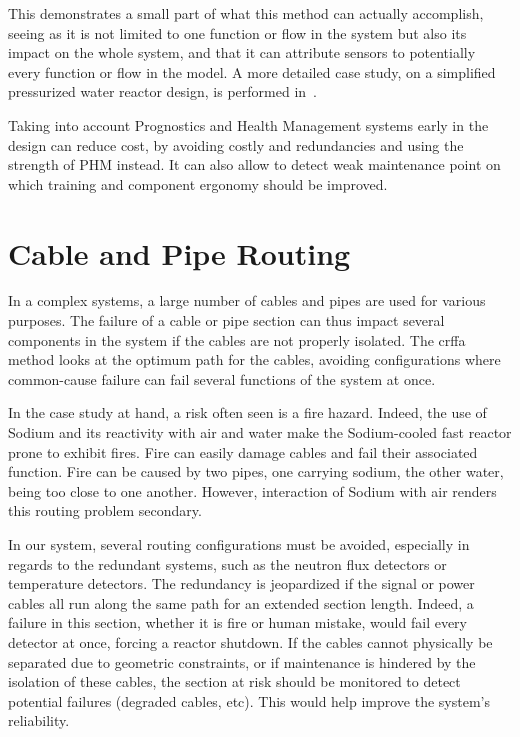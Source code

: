This demonstrates a small part of what this method can actually accomplish, seeing as it is not limited to one function or flow in the system but also its impact on the whole system, and that it can attribute sensors to potentially every function or flow in the model. A more detailed case study, on a simplified pressurized water reactor design, is performed in~\cite{lher2016}.

Taking into account Prognostics and Health Management systems early in the design can reduce cost, by avoiding costly and redundancies and using the strength of PHM instead. It can also allow to detect weak maintenance point on which training and component ergonomy should be improved.

\section{Cable and Pipe Routing}
\label{chap:crffa}

In a complex systems, a large number of cables and pipes are used for various purposes. The failure of a cable or pipe section can thus impact several components in the system if the cables are not properly isolated. The \gls{crffa} method looks at the optimum path for the cables, avoiding configurations where common-cause failure can fail several functions of the system at once.

In the case study at hand, a risk often seen is a fire hazard. Indeed, the use of Sodium and its reactivity with air and water make the Sodium-cooled fast reactor prone to exhibit fires. Fire can easily damage cables and fail their associated function. Fire can be caused by two pipes, one carrying sodium, the other water, being too close to one another. However, interaction of Sodium with air renders this routing problem secondary.

In our system, several routing configurations must be avoided, especially in regards to the redundant systems, such as the neutron flux detectors or temperature detectors. The redundancy is jeopardized if the signal or power cables all run along the same path for an extended section length. Indeed, a failure in this section, whether it is fire or human mistake, would fail every detector at once, forcing a reactor shutdown. If the cables cannot physically be separated due to geometric constraints, or if maintenance is hindered by the isolation of these cables, the section at risk should be monitored to detect potential failures (degraded cables, etc). This would help improve the system's reliability.

